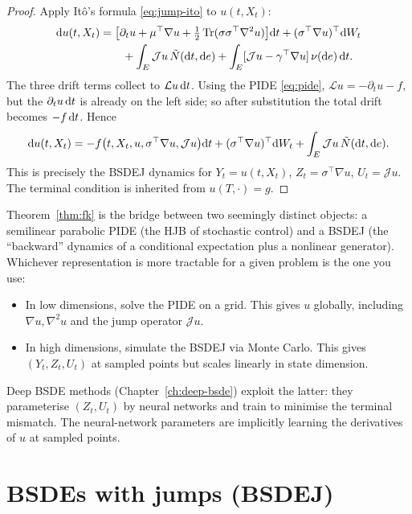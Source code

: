 \begin{proof}
Apply It\^o's formula \eqref{eq:jump-ito} to $u(t, X_t)$:
\begin{align*}
  \mathrm{d} u(t, X_t) &= \bigl[\partial_t u + \mu^\top \nabla u + \tfrac{1}{2} \operatorname{Tr}(\sigma \sigma^\top \nabla^2 u)\bigr] \mathrm{d} t + (\sigma^\top \nabla u)^\top \mathrm{d} W_t \\
  &\qquad + \int_E \mathcal{J} u \, \tilde N(\mathrm{d} t, \mathrm{d} e) + \int_E [\mathcal{J} u - \gamma^\top \nabla u] \, \nu(\mathrm{d} e) \, \mathrm{d} t.
\end{align*}
The three drift terms collect to $\mathcal{L} u \, \mathrm{d} t$. Using the PIDE \eqref{eq:pide}, $\mathcal{L} u = -\partial_t u - f$, but the $\partial_t u \, \mathrm{d} t$ is already on the left side; so after substitution the total drift becomes $-f\, \mathrm{d} t$. Hence
\[
  \mathrm{d} u(t, X_t) = -f\bigl(t, X_t, u, \sigma^\top \nabla u, \mathcal{J} u\bigr)\mathrm{d} t + (\sigma^\top \nabla u)^\top \mathrm{d} W_t + \int_E \mathcal{J} u \, \tilde N(\mathrm{d} t, \mathrm{d} e).
\]
This is precisely the BSDEJ dynamics for $Y_t = u(t, X_t)$, $Z_t = \sigma^\top \nabla u$, $U_t = \mathcal{J} u$. The terminal condition is inherited from $u(T, \cdot) = g$.
\end{proof}

\begin{intuition}
Theorem~\ref{thm:fk} is the bridge between two seemingly distinct objects: a semilinear parabolic PIDE (the HJB of stochastic control) and a BSDEJ (the ``backward'' dynamics of a conditional expectation plus a nonlinear generator). Whichever representation is more tractable for a given problem is the one you use:

\begin{itemize}[leftmargin=2em]
  \item In low dimensions, solve the PIDE on a grid. This gives $u$ globally, including $\nabla u, \nabla^2 u$ and the jump operator $\mathcal{J} u$.
  \item In high dimensions, simulate the BSDEJ via Monte Carlo. This gives $(Y_t, Z_t, U_t)$ at sampled points but scales linearly in state dimension.
\end{itemize}

Deep BSDE methods (Chapter~\ref{ch:deep-bsde}) exploit the latter: they parameterise $(Z_t, U_t)$ by neural networks and train to minimise the terminal mismatch. The neural-network parameters are implicitly learning the derivatives of $u$ at sampled points.
\end{intuition}

\section{BSDEs with jumps (BSDEJ)}
\label{sec:bsdej}

